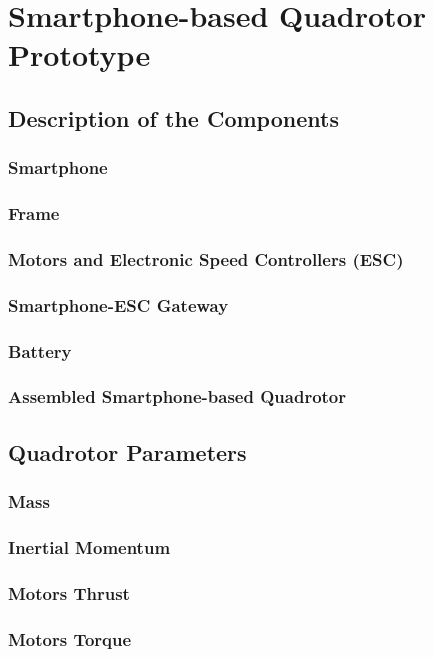 \chapter{Smartphone-based Quadrotor Prototype} \label{ch:prototype}


\section{Description of the Components}


\subsection{Smartphone}


\subsection{Frame}

\subsection{Motors and Electronic Speed Controllers (ESC)}


\subsection{Smartphone-ESC Gateway}


\subsection{Battery}


\subsection{Assembled Smartphone-based Quadrotor}

\section{Quadrotor Parameters}

\subsection{Mass}


\subsection{Inertial Momentum}


\subsection{Motors Thrust}


\subsection{Motors Torque}

